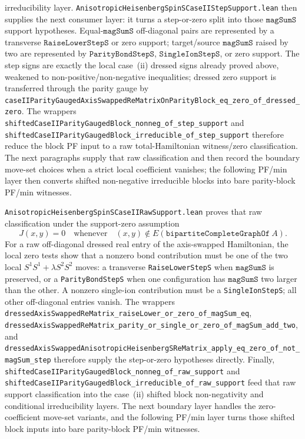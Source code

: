 \documentclass[a4paper,11pt]{article}
\begin{document}
irreducibility layer.
\texttt{AnisotropicHeisenbergSpinSCaseIIStepSupport.lean} then supplies the
next consumer layer: it turns a step-or-zero split into those
\(\texttt{magSumS}\) support hypotheses.  Equal-\(\texttt{magSumS}\)
off-diagonal pairs are represented by a transverse
\(\texttt{RaiseLowerStepS}\) or zero support; target/source
\(\texttt{magSumS}\) raised by two are represented by
\(\texttt{ParityBondStepS}\), \(\texttt{SingleIonStepS}\), or zero support.
The step signs are exactly the local case~(ii) dressed signs already proved
above, weakened to non-positive/non-negative inequalities; dressed zero support
is transferred through the parity gauge by
\texttt{caseIIParityGaugedAxisSwappedReMatrixOnParityBlock\_eq\_zero\_of\_dressed\_zero}.
The wrappers
\texttt{shiftedCaseIIParityGaugedBlock\_nonneg\_of\_step\_support} and
\texttt{shiftedCaseIIParityGaugedBlock\_irreducible\_of\_step\_support}
therefore reduce the block PF input to a raw total-Hamiltonian witness/zero
classification.  The next paragraphs supply that raw classification and then
record the boundary move-set choices when a strict local coefficient vanishes;
the following PF/min layer then converts shifted non-negative irreducible
blocks into bare parity-block PF/min witnesses.

\texttt{AnisotropicHeisenbergSpinSCaseIIRawSupport.lean} proves that raw
classification under the support-zero assumption
\[
  J(x,y)=0 \quad\text{whenever}\quad
  (x,y)\notin E(\texttt{bipartiteCompleteGraphOf}~A).
\]
For a raw off-diagonal dressed real entry of the axis-swapped Hamiltonian,
the local zero tests show that a nonzero bond contribution must be one of the
two local \(S^1S^1+\lambda S^2S^2\) moves: a transverse
\texttt{RaiseLowerStepS} when \(\texttt{magSumS}\) is preserved, or a
\texttt{ParityBondStepS} when one configuration has \(\texttt{magSumS}\) two
larger than the other.  A nonzero single-ion contribution must be a
\texttt{SingleIonStepS}; all other off-diagonal entries vanish.  The wrappers
\texttt{dressedAxisSwappedReMatrix\_raiseLower\_or\_zero\_of\_magSum\_eq},
\texttt{dressedAxisSwappedReMatrix\_parity\_or\_single\_or\_zero\_of\_magSum\_add\_two},
and
\texttt{dressedAxisSwappedAnisotropicHeisenbergSReMatrix\_apply\_eq\_zero\_of\_not\_magSum\_step}
therefore supply the step-or-zero hypotheses directly.  Finally,
\texttt{shiftedCaseIIParityGaugedBlock\_nonneg\_of\_raw\_support} and
\texttt{shiftedCaseIIParityGaugedBlock\_irreducible\_of\_raw\_support} feed
that raw support classification into the case~(ii) shifted block
non-negativity and conditional irreducibility layers.  The next boundary layer
handles the zero-coefficient move-set variants, and the following PF/min layer
turns those shifted block inputs into bare parity-block PF/min witnesses.
\end{document}
